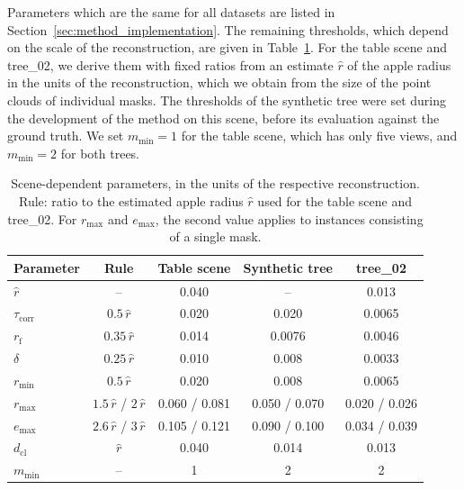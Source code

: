 \documentclass[english, egger, bsc]{vcethesis}
\begin{document}
Parameters which are the same for all datasets are listed in Section~\ref{sec:method_implementation}. The remaining thresholds, which depend on the scale of the reconstruction, are given in Table~\ref{tab:results_params}. For the table scene and tree\_02, we derive them with fixed ratios from an estimate $\hat{r}$ of the apple radius in the units of the reconstruction, which we obtain from the size of the point clouds of individual masks. The thresholds of the synthetic tree were set during the development of the method on this scene, before its evaluation against the ground truth. We set $m_{\min} = 1$ for the table scene, which has only five views, and $m_{\min} = 2$ for both trees.
\begin{table}[tbp]
    \centering
    \caption{Scene-dependent parameters, in the units of the respective
    reconstruction. Rule: ratio to the estimated apple radius $\hat{r}$
    used for the table scene and tree\_02. For $r_{\max}$ and
    $e_{\max}$, the second value applies to instances consisting of a
    single mask.}
    \label{tab:results_params}
    \small
    \begin{tabular}{lcccc}
        \toprule
        Parameter & Rule & Table scene & Synthetic tree & tree\_02 \\
        \midrule
        $\hat{r}$              & --
            & 0.040 & -- & 0.013 \\
        $\tau_{\mathrm{corr}}$ & $0.5\,\hat{r}$
            & 0.020 & 0.020 & 0.0065 \\
        $r_{\mathrm{f}}$       & $0.35\,\hat{r}$
            & 0.014 & 0.0076 & 0.0046 \\
        $\delta$               & $0.25\,\hat{r}$
            & 0.010 & 0.008 & 0.0033 \\
        $r_{\min}$             & $0.5\,\hat{r}$
            & 0.020 & 0.008 & 0.0065 \\
        $r_{\max}$             & $1.5\,\hat{r}$ / $2\,\hat{r}$
            & 0.060 / 0.081 & 0.050 / 0.070 & 0.020 / 0.026 \\
        $e_{\max}$             & $2.6\,\hat{r}$ / $3\,\hat{r}$
            & 0.105 / 0.121 & 0.090 / 0.100 & 0.034 / 0.039 \\
        $d_{\mathrm{cl}}$      & $\hat{r}$
            & 0.040 & 0.014 & 0.013 \\
        $m_{\min}$             & --
            & 1 & 2 & 2 \\
        \bottomrule
    \end{tabular}
\end{table}
\end{document}
